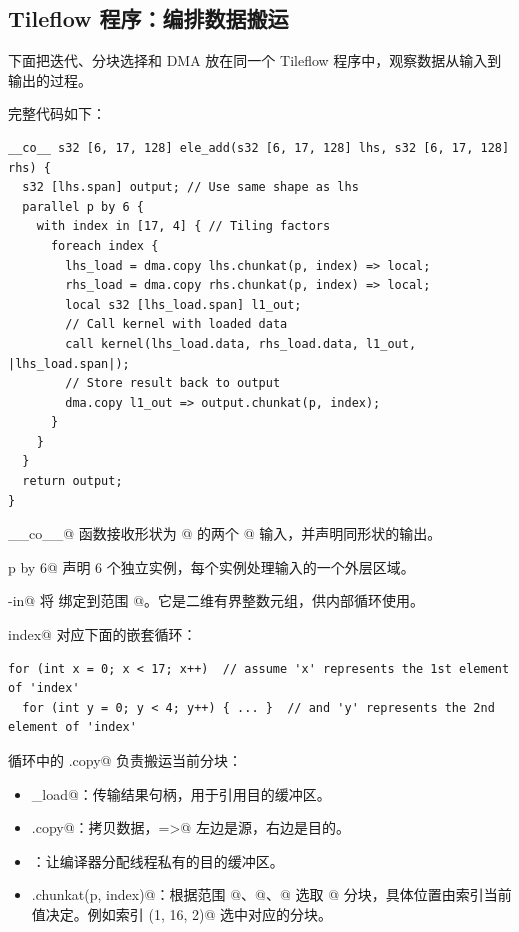 \subsection*{Tileflow 程序：编排数据搬运}

下面把迭代、分块选择和 DMA 放在同一个 Tileflow 程序中，观察数据从输入到输出的过程。

完整代码如下：

\begin{lstlisting}[language=croqtile,caption={tileflow 程序}]
__co__ s32 [6, 17, 128] ele_add(s32 [6, 17, 128] lhs, s32 [6, 17, 128] rhs) {
  s32 [lhs.span] output; // Use same shape as lhs
  parallel p by 6 {
    with index in [17, 4] { // Tiling factors
      foreach index {
        lhs_load = dma.copy lhs.chunkat(p, index) => local;
        rhs_load = dma.copy rhs.chunkat(p, index) => local;
        local s32 [lhs_load.span] l1_out;
        // Call kernel with loaded data
        call kernel(lhs_load.data, rhs_load.data, l1_out, |lhs_load.span|);
        // Store result back to output
        dma.copy l1_out => output.chunkat(p, index);
      }
    }
  }
  return output;
}
\end{lstlisting}

\co@__co__@ 函数接收形状为 \co@[6, 17, 128]@ 的两个 @ 输入，并声明同形状的输出。

\co@parallel p by 6@ 声明 6 个独立实例，每个实例处理输入的一个外层区域。

\co@with-in@ 将 \co@index@ 绑定到范围 \co@[17, 4]@。它是二维有界整数元组，供内部循环使用。

\co@foreach index@ 对应下面的嵌套循环：

\begin{lstlisting}[language=croqtile,caption={等价的 C++ 循环}]
for (int x = 0; x < 17; x++)  // assume 'x' represents the 1st element of 'index'
  for (int y = 0; y < 4; y++) { ... }  // and 'y' represents the 2nd element of 'index'
\end{lstlisting}

循环中的 \co@dma.copy@ 负责搬运当前分块：

\begin{itemize}[leftmargin=1.6em]
\item \co@lhs_load@：传输结果句柄，用于引用目的缓冲区。
\item \co@dma.copy@：拷贝数据，\co@=>@ 左边是源，右边是目的。
\item \co@local@：让编译器分配线程私有的目的缓冲区。
\item \co@lhs.chunkat(p, index)@：根据范围 @、@、@ 选取 \co@[1, 1, 32]@ 分块，具体位置由索引当前值决定。例如索引 \co@(1, 16, 2)@ 选中对应的分块。
\end{itemize}

